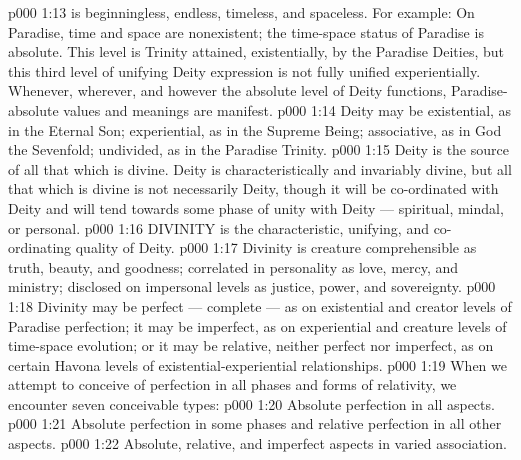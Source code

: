 \vs p000 1:13 \pc {} is beginningless, endless, timeless, and spaceless. For example: On Paradise, time and space are nonexistent; the time\hyp{}space status of Paradise is absolute. This level is Trinity attained, existentially, by the Paradise Deities, but this third level of unifying Deity expression is not fully unified experientially. Whenever, wherever, and however the absolute level of Deity functions, Paradise\hyp{}absolute values and meanings are manifest.
\vs p000 1:14 \pc Deity may be existential, as in the Eternal Son; experiential, as in the Supreme Being; associative, as in God the Sevenfold; undivided, as in the Paradise Trinity.
\vs p000 1:15 Deity is the source of all that which is divine. Deity is characteristically and invariably divine, but all that which is divine is not necessarily Deity, though it will be co\hyp{}ordinated with Deity and will tend towards some phase of unity with Deity --- spiritual, mindal, or personal.
\vs p000 1:16 \pc DIVINITY is the characteristic, unifying, and co\hyp{}ordinating quality of Deity.
\vs p000 1:17 Divinity is creature comprehensible as truth, beauty, and goodness; correlated in personality as love, mercy, and ministry; disclosed on impersonal levels as justice, power, and sovereignty.
\vs p000 1:18 Divinity may be perfect --- complete --- as on existential and creator levels of Paradise perfection; it may be imperfect, as on experiential and creature levels of time\hyp{}space evolution; or it may be relative, neither perfect nor imperfect, as on certain Havona levels of existential\hyp{}experiential relationships.
\vs p000 1:19 \pc When we attempt to conceive of perfection in all phases and forms of relativity, we encounter seven conceivable types:
\vs p000 1:20 \bibnobreakspace Absolute perfection in all aspects.
\vs p000 1:21 \bibnobreakspace Absolute perfection in some phases and relative perfection in all other aspects.
\vs p000 1:22 \bibnobreakspace Absolute, relative, and imperfect aspects in varied association.
